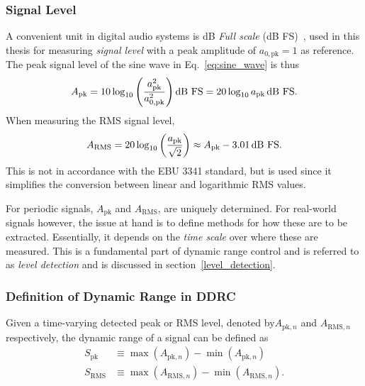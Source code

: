 \documentclass[../main2.tex]{subfiles}
\begin{document}
\subsubsection{Signal Level}
A convenient unit in digital audio systems is dB \emph{Full scale} (dB FS)~\cite{db_fullscale}, used in this thesis for measuring \emph{signal level} with a peak amplitude of $a_{0, \text{pk}} = 1$ as reference. The peak signal level of the sine wave in Eq.~\eqref{eq:sine_wave} is thus
\begin{equation}
A_\text{pk} = 10 \log_{10} \left( \frac{a_\text{pk}^2}{a_{0, \text{pk}}^2} \right) \text{dB FS} = 20 \log_{10} a_\text{pk} \mskip3mu\text{dB FS}.
\end{equation}
When measuring the RMS signal level, 
\begin{equation}
A_\text{RMS} = 20\log_{10} \left( \frac{a_\text{pk}}{\sqrt 2} \right) \approx A_\text{pk} - 3.01 \mskip3mu\text{dB FS}.
\end{equation}
This is not in accordance with the EBU 3341 standard, but is used  since it simplifies the conversion between linear and logarithmic RMS values.

For periodic signals, $A_\text{pk}$ and $A_\text{RMS}$, are uniquely determined. For real-world signals however, the issue at hand is to define methods for how these are to be extracted. Essentially, it depends on the \emph{time scale} over where these are measured. This is a fundamental part of dynamic range control and is referred to as \emph{level detection} and is discussed in section~\ref{level_detection}. 

\subsubsection{Definition of Dynamic Range in DDRC}
Given a time-varying detected peak or RMS level,  denoted by$A_{\text{pk},n}$ and $A_{\text{RMS},n}$ respectively, the dynamic range of a signal can be defined as
\begin{align}
S_\text{pk} &\equiv \max(A_{\text{pk},n}) - \min(A_{\text{pk},n})\label{eq:s_peak}\\
S_\text{RMS} &\equiv \max(A_{\text{RMS},n}) - \min(A_{\text{RMS},n}).\label{eq:s_RMS}
\end{align}
\end{document}
